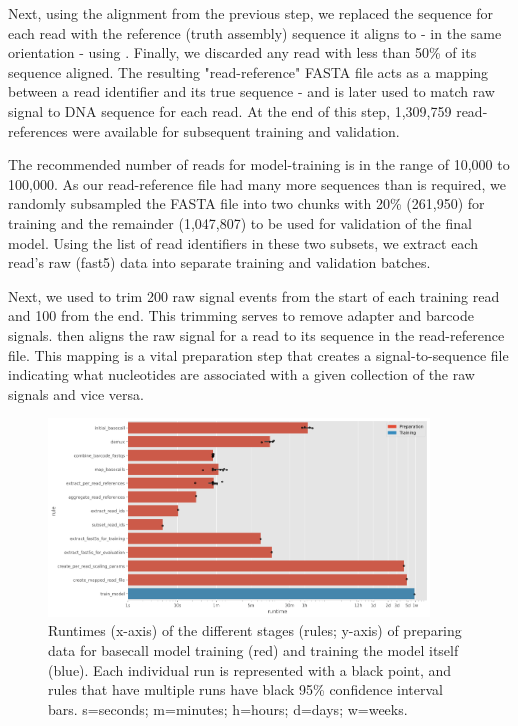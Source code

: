 Next, using the alignment from the previous step, we replaced the sequence for each read with the reference (truth assembly) sequence it aligns to - in the same orientation - using \taiyaki{}. Finally, we discarded any read with less than 50\% of its sequence aligned. The resulting "read-reference" FASTA file acts as a mapping between a read identifier and its true sequence - and is later used to match raw signal to DNA sequence for each read. At the end of this step, 1,309,759 read-references were available for subsequent training and validation.

The recommended number of reads for \taiyaki{} model-training is in the range of 10,000 to 100,000. As our read-reference file had many more sequences than is required, we randomly subsampled the FASTA file into two chunks with 20\% (261,950) for training and the remainder (1,047,807) to be used for validation of the final model. Using the list of read identifiers in these two subsets, we extract each read's raw (fast5) data into separate training and validation batches. 

Next, we used \taiyaki{} to trim 200 raw signal events from the start of each training read and 100 from the end. This trimming serves to remove adapter and barcode signals. \taiyaki{} then aligns the raw signal for a read to its sequence in the read-reference file. This mapping is a vital preparation step that creates a signal-to-sequence file indicating what nucleotides are associated with a given collection of the raw signals and vice versa.

\begin{figure}
\includegraphics[width=0.9\textwidth]{Chapter4/Figs/prep_runtime.png}
\centering
\caption{Runtimes (x-axis) of the different stages (rules; y-axis) of preparing data for basecall model training (red) and training the model itself (blue). Each individual run is represented with a black point, and rules that have multiple runs have black 95\% confidence interval bars. s=seconds; m=minutes; h=hours; d=days; w=weeks.}
\label{fig:prep_runtime}
\end{figure}

